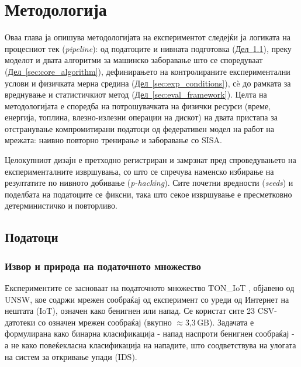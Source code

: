 \chapter{Методологија} %
\label{chap:methodology}

Оваа глава ја опишува методологијата на експериментот следејќи ја логиката на процесниот тек (\emph{pipeline}): од податоците и нивната подготовка
(\hyperref[sec:data]{Дел~\ref*{sec:data}}), преку моделот и двата алгоритми за машинско заборавање што се споредуваат (\hyperref[sec:core_algorithm]{Дел~\ref*{sec:core_algorithm}}),
дефинирањето на контролираните експериментални услови и физичката мерна средина
(\hyperref[sec:exp_conditions]{Дел~\ref*{sec:exp_conditions}}), сè до рамката за
вреднување и статистичкиот метод
(\hyperref[sec:eval_framework]{Дел~\ref*{sec:eval_framework}}). Целта на
методологијата е споредба на потрошувачката на физички ресурси (време, енергија, топлина,
влезно-излезни операции на дискот) на двата пристапа за отстранување компромитирани податоци од
федеративен модел на работ на мрежата: наивно повторно тренирање и заборавање со SISA.

Целокупниот дизајн е претходно регистриран и замрзнат пред спроведувањето на
експерименталните извршувања, со што се спречува наменско избирање на резултатите по нивното добивање (\emph{p-hacking}).
Сите почетни вредности (\emph{seeds}) и поделбата на податоците се фиксни, така што секое
извршување е пресметковно детерминистичко и повторливо.

\section{Податоци} %
\label{sec:data}

\subsection{Извор и природа на податочното множество}
Експериментите се засноваат на податочното множество TON\_IoT
\cite{moustafa2021toniot}, објавено од UNSW, кое содржи мрежен сообраќај од експеримент со
уреди од Интернет на нештата (IoT), означен како бенигнен или напад. Се користат сите
23 CSV-датотеки со означен мрежен сообраќај (вкупно $\approx$3,3\,GB).
Задачата е формулирана како бинарна класификација - напад наспроти
бенигнен сообраќај - а не како повеќекласна класификација на нападите, што соодветствува
на улогата на систем за откривање упади (IDS).

